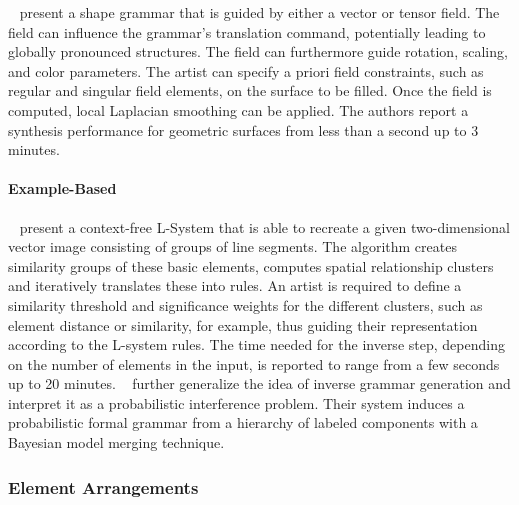 \citeauthor*{yuanyuan_2011_gso}~\cite{yuanyuan_2011_gso} present a shape grammar that is guided by either a vector or tensor field. The field can influence the grammar's translation command, potentially leading to globally pronounced structures. The field can furthermore guide rotation, scaling, and color parameters. The artist can specify a priori field constraints, such as regular and singular field elements, on the surface to be filled. Once the field is computed, local Laplacian smoothing can be applied. The authors report a synthesis performance for geometric surfaces from less than a second up to 3 minutes. 
\paragraph*{Example-Based}
\label{para:analysis_rulebased_example}

\citeauthor*{stava_2010_ipm}~\cite{stava_2010_ipm} present a context-free L-System that is able to recreate a given two-dimensional vector image consisting of groups of line segments. The algorithm creates similarity groups of these basic elements, computes spatial relationship clusters and iteratively translates these into rules. An artist is required to define a similarity threshold and significance weights for the different clusters, such as element distance or similarity, for example, thus guiding their representation according to the L-system rules. The time needed for the inverse step, depending on the number of elements in the input, is reported to range from a few seconds up to 20 minutes. \citeauthor*{talton_2012_ldp}~\cite{talton_2012_ldp} further generalize the idea of inverse grammar generation and interpret it as a probabilistic interference problem. Their system induces a probabilistic formal grammar from a hierarchy of labeled components with a Bayesian model merging technique.


\subsubsection{Element Arrangements}
\label{subsubsec:analysis_element_arrangements}

